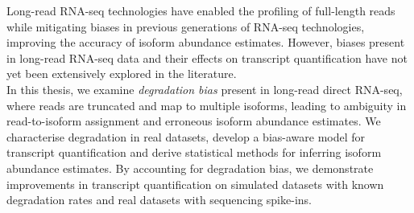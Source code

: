 
Long-read RNA-seq technologies have enabled the profiling of full-length reads while mitigating biases in previous generations of RNA-seq technologies, improving the accuracy of isoform abundance estimates. However, biases present in long-read RNA-seq data and their effects on transcript quantification have not yet been extensively explored in the literature.\\[10pt] 
In this thesis, we examine \textit{degradation bias} present in long-read direct RNA-seq, where reads are truncated and map to multiple isoforms, leading to ambiguity in read-to-isoform assignment and erroneous isoform abundance estimates. We characterise degradation in real datasets, develop a bias-aware model for transcript quantification and derive statistical methods for inferring isoform abundance estimates. By accounting for degradation bias, we demonstrate improvements in transcript quantification on simulated datasets with known degradation rates and real datasets with sequencing spike-ins.

